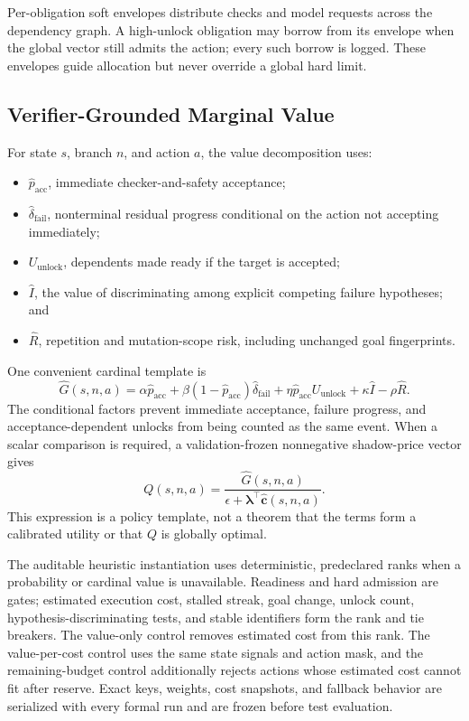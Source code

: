 Per-obligation soft envelopes distribute checks and model requests across the
dependency graph. A high-unlock obligation may borrow from its envelope when
the global vector still admits the action; every such borrow is logged. These
envelopes guide allocation but never override a global hard limit.

\subsection{Verifier-Grounded Marginal Value}

For state \(s\), branch \(n\), and action \(a\), the value decomposition uses:

\begin{itemize}
    \item \(\hat p_{\mathrm{acc}}\), immediate checker-and-safety acceptance;
    \item \(\hat\delta_{\mathrm{fail}}\), nonterminal residual progress
    conditional on the action not accepting immediately;
    \item \(U_{\mathrm{unlock}}\), dependents made ready if the target is
    accepted;
    \item \(\hat I\), the value of discriminating among explicit competing
    failure hypotheses; and
    \item \(\hat R\), repetition and mutation-scope risk, including unchanged
    goal fingerprints.
\end{itemize}

One convenient cardinal template is
\[
  \widehat G(s,n,a)=
  \alpha\hat p_{\mathrm{acc}}
  +\beta(1-\hat p_{\mathrm{acc}})\hat\delta_{\mathrm{fail}}
  +\eta\hat p_{\mathrm{acc}}U_{\mathrm{unlock}}
  +\kappa\hat I
  -\rho\hat R.
\]
The conditional factors prevent immediate acceptance, failure progress, and
acceptance-dependent unlocks from being counted as the same event. When a
scalar comparison is required, a validation-frozen nonnegative shadow-price
vector gives
\[
  Q(s,n,a)=
  \frac{\widehat G(s,n,a)}
       {\epsilon+\boldsymbol\lambda^\top
        \hat{\mathbf c}(s,n,a)}.
\]
This expression is a policy template, not a theorem that the terms form a
calibrated utility or that \(Q\) is globally optimal.

The auditable heuristic instantiation uses deterministic, predeclared ranks
when a probability or cardinal value is unavailable. Readiness and hard
admission are gates; estimated execution cost, stalled streak, goal change,
unlock count, hypothesis-discriminating tests, and stable identifiers form the
rank and tie breakers. The value-only control removes estimated cost from this
rank. The value-per-cost control uses the same state signals and action mask,
and the remaining-budget control additionally rejects actions whose estimated
cost cannot fit after reserve. Exact keys, weights, cost snapshots, and fallback
behavior are serialized with every formal run and are frozen before test
evaluation.


